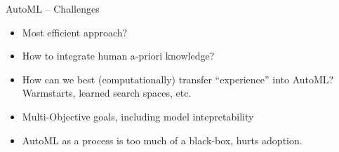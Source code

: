 \documentclass[11pt,compress,t,notes=noshow, xcolor=table]{beamer}
\begin{document}
\begin{frame}{AutoML -- Challenges}
\begin{itemize}
    \item Most efficient approach? 
    \item How to integrate human a-priori knowledge?
    \item How can we best (computationally) transfer ``experience'' into AutoML?
    Warmstarts, learned search spaces, etc. 
    \item Multi-Objective goals, including model intepretability
    \item AutoML as a process is too much of a black-box, hurts adoption.
\end{itemize}
\end{frame}


\endlecture
\end{document}
